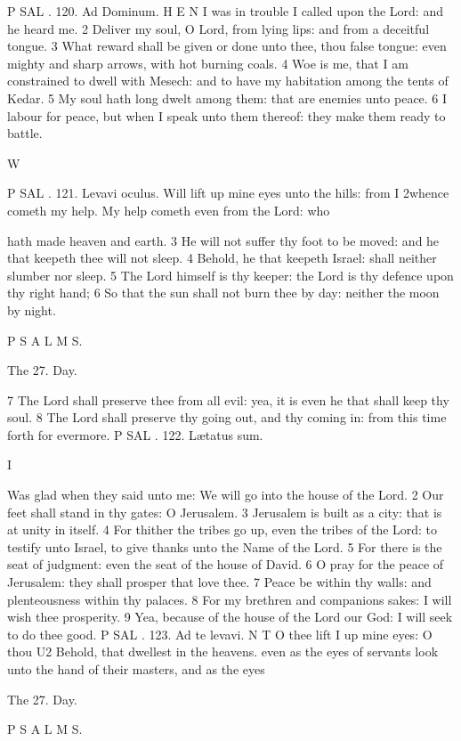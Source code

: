 P SAL . 120. Ad Dominum. H E N I was in trouble I called upon the Lord: and he heard me. 2 Deliver my soul, O Lord, from lying lips: and from a deceitful tongue. 3 What reward shall be given or done unto thee, thou false tongue: even mighty and sharp arrows, with hot burning coals. 4 Woe is me, that I am constrained to dwell with Mesech: and to have my habitation among the tents of Kedar. 5 My soul hath long dwelt among them: that are enemies unto peace. 6 I labour for peace, but when I speak unto them thereof: they make them ready to battle.

W

P SAL . 121. Levavi oculus. Will lift up mine eyes unto the hills: from I 2whence cometh my help. My help cometh even from the Lord: who

hath made heaven and earth. 3 He will not suffer thy foot to be moved: and he that keepeth thee will not sleep. 4 Behold, he that keepeth Israel: shall neither slumber nor sleep. 5 The Lord himself is thy keeper: the Lord is thy defence upon thy right hand; 6 So that the sun shall not burn thee by day: neither the moon by night.

P S A L M S.

The 27. Day.

7 The Lord shall preserve thee from all evil: yea, it is even he that shall keep thy soul. 8 The Lord shall preserve thy going out, and thy coming in: from this time forth for evermore. P SAL . 122. Lætatus sum.

I

Was glad when they said unto me: We will go into the house of the Lord. 2 Our feet shall stand in thy gates: O Jerusalem. 3 Jerusalem is built as a city: that is at unity in itself. 4 For thither the tribes go up, even the tribes of the Lord: to testify unto Israel, to give thanks unto the Name of the Lord. 5 For there is the seat of judgment: even the seat of the house of David. 6 O pray for the peace of Jerusalem: they shall prosper that love thee. 7 Peace be within thy walls: and plenteousness within thy palaces. 8 For my brethren and companions sakes: I will wish thee prosperity. 9 Yea, because of the house of the Lord our God: I will seek to do thee good. P SAL . 123. Ad te levavi. N T O thee lift I up mine eyes: O thou U2 Behold, that dwellest in the heavens. even as the eyes of servants look unto the hand of their masters, and as the eyes

The 27. Day.

P S A L M S.

